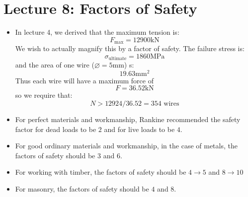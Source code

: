 \section{Lecture 8: Factors of Safety}
\begin{itemize}
    \item In lecture 4, we derived that the maximum tension is:
    \begin{equation}
        F_\text{max}=12900\si{\kilo\newton}
        \label{eq:}
    \end{equation}
    We wish to actually magnify this by a factor of safety. The failure stress is:
    \begin{equation}
        \sigma_\text{ultimate}=1860\si{\mega\pascal}
        \label{eq:}
    \end{equation}
    and the area of one wire ($\diameter=5\si{\milli\meter}$) s:
    \begin{equation}
        19.63 \si{\milli\meter\squared}
        \label{eq:}
    \end{equation}
    Thus each wire will have a maximum force of
    \begin{equation}
        F=36.52\si{\kilo\newton}
        \label{eq:}
    \end{equation}
    so we require that:
    \begin{equation}
        N > 12924/36.52 = 354\text{ wires}
        \label{eq:}
    \end{equation}
    \item For perfect materials and workmanship, Rankine recommended the safety factor for dead loads to be $2$ and for live loads to be $4$.
    \item For good ordinary materials and workmanship, in the case of metals, the factors of safety should be $3$ and $6$.
    \item For working with timber, the factors of safety should be $4 \to 5$ and $8\to 10$
    \item For masonry, the factors of safety should be $4$ and $8$.
\end{itemize}